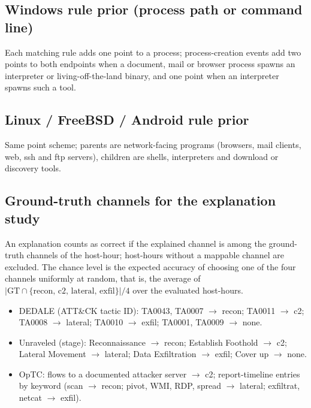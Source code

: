 \subsection{Windows rule prior (process path or command line)}
Each matching rule adds one point to a process; process-creation events add two points to both endpoints when a
document, mail or browser process spawns an interpreter or living-off-the-land binary, and one point when an
interpreter spawns such a tool.
\begin{itemize}\footnotesize
\end{itemize}

\subsection{Linux / FreeBSD / Android rule prior}
Same point scheme; parents are network-facing programs (browsers, mail clients, web, ssh and ftp servers), children
are shells, interpreters and download or discovery tools.
\begin{itemize}\footnotesize
\end{itemize}

\subsection{Ground-truth channels for the explanation study}
An explanation counts as correct if the explained channel is among the ground-truth channels of the host-hour;
host-hours without a mappable channel are excluded. The chance level is the expected accuracy of choosing one of the
four channels uniformly at random, that is, the average of $|\mathrm{GT}\cap\{\text{recon, c2, lateral, exfil}\}|/4$
over the evaluated host-hours.
\begin{itemize}\footnotesize
\item DEDALE (ATT\&CK tactic ID): TA0043, TA0007 $\rightarrow$ recon; TA0011 $\rightarrow$ c2; TA0008 $\rightarrow$
lateral; TA0010 $\rightarrow$ exfil; TA0001, TA0009 $\rightarrow$ none.
\item Unraveled (stage): Reconnaissance $\rightarrow$ recon; Establish Foothold $\rightarrow$ c2; Lateral Movement
$\rightarrow$ lateral; Data Exfiltration $\rightarrow$ exfil; Cover up $\rightarrow$ none.
\item OpTC: flows to a documented attacker server $\rightarrow$ c2; report-timeline entries by keyword (scan
$\rightarrow$ recon; pivot, WMI, RDP, spread $\rightarrow$ lateral; exfiltrat, netcat $\rightarrow$ exfil).
\end{itemize}

